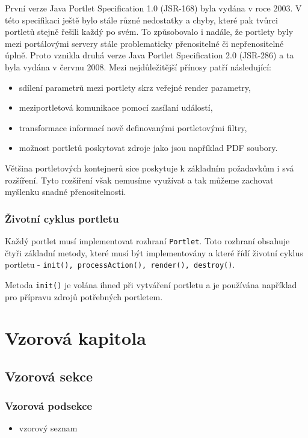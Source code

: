 \documentclass{fithesis}
\begin{document}
První verze Java Portlet Specification 1.0 (JSR-168) byla vydána v roce 2003. V této specifikaci ještě bylo stále různé nedostatky a chyby, které pak tvůrci portletů stejně řešili každý po svém. To způsobovalo i nadále, že portlety byly mezi portálovými servery stále problematicky přenositelné či nepřenositelné úplně. Proto vznikla druhá verze Java Portlet Specification 2.0 (JSR-286) a ta byla vydána v červnu 2008. Mezi nejdůležitější přínosy patří následující:
\begin{itemize}
\item sdílení parametrů mezi portlety skrz veřejné render parametry,
\item meziportletová komunikace pomocí zasílaní událostí,
\item transformace informací nově definovanými portletovými filtry,
\item možnost portletů poskytovat zdroje jako jsou například PDF soubory.
\end{itemize}
Většina portletových kontejnerů sice poskytuje k základním požadavkům i svá rozšíření. Tyto rozšíření však nemusíme využívat a tak můžeme zachovat myšlenku snadné přenositelnosti.

\subsection{Životní cyklus portletu}
Každý portlet musí implementovat rozhraní \verb|Portlet|. Toto rozhraní obsahuje čtyři základní metody, které musí být implementovány a které řídí životní cyklus portletu - \verb|init(), processAction(), render(), destroy()|.

Metoda \verb|init()| je volána ihned při vytváření portletu a je používána například pro přípravu zdrojů potřebných portletem.



\chapter{Vzorová kapitola}
\section{Vzorová sekce}
\subsection{Vzorová podsekce}



\begin{itemize}
\item vzorový seznam
\end{itemize}
\end{document}
